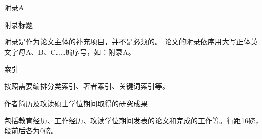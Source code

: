 \documentclass{bjtuthesis}
\begin{document}
\nocite{*}

\pagestyle{myfancy}

\cleardoublepage
\begin{center}
    {\heiti 附录A}
\end{center}
\begin{center}
    {\heiti 附录标题}
\end{center}

\indent{}附录是作为论文主体的补充项目，并不是必须的。
论文的附录依序用大写正体英文字母A、B、C……编序号，如：附录A。
\cleardoublepage
\begin{center}
    {\heiti 索引}
\end{center}

\indent{}按照需要编排分类索引、著者索引、关键词索引等。
\cleardoublepage
\begin{thecenter}
    作者简历及攻读硕士学位期间取得的研究成果
\end{thecenter}

包括教育经历、工作经历、攻读学位期间发表的论文和完成的工作等。行距16磅，段前后各为0磅。
\cleardoublepage
\cstatement
\clastpage
\end{document}
